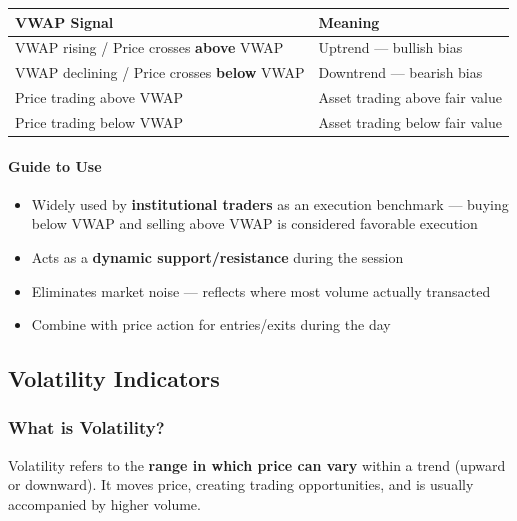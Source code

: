 \documentclass[12pt,openany]{book}
\begin{document}
\begin{center}
\small
\renewcommand{\arraystretch}{1.2}
\begin{tabular}{|L{0.30\textwidth}|L{0.60\textwidth}|}
\hline
 \textbf{VWAP Signal} & \textbf{Meaning} \\ \hline
 VWAP rising / Price crosses \textbf{above} VWAP & Uptrend --- bullish bias \\ \hline
 VWAP declining / Price crosses \textbf{below} VWAP & Downtrend --- bearish bias \\ \hline
 Price trading above VWAP & Asset trading above fair value \\ \hline
 Price trading below VWAP & Asset trading below fair value \\ \hline
\end{tabular}
\end{center}

\paragraph{Guide to Use}
\begin{itemize}[leftmargin=*]
    \item Widely used by \textbf{institutional traders} as an execution benchmark --- buying below VWAP and selling above VWAP is considered favorable execution
    \item Acts as a \textbf{dynamic support/resistance} during the session
    \item Eliminates market noise --- reflects where most volume actually transacted
    \item Combine with price action for entries/exits during the day
\end{itemize}

\subsection{Volatility Indicators}

\subsubsection{What is Volatility?}

Volatility refers to the \textbf{range in which price can vary} within a trend (upward or downward). It moves price, creating trading opportunities, and is usually accompanied by higher volume.
\end{document}
